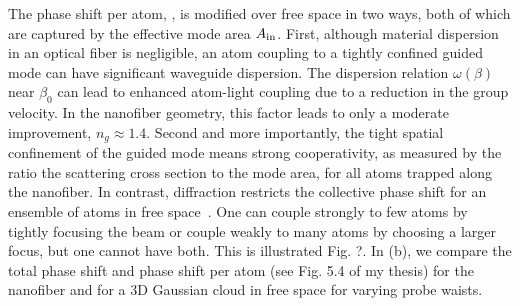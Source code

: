 \documentclass[preprint,aps,pra,onecolumn]{revtex4-1} %
\newcommand{\vac}{{\rm vac}}
\newcommand{\comment}[1]{{\color{Maroon} #1}}
\begin{document}
The phase shift per atom, , is modified over free space in two ways, both of which are captured by the effective mode area $A_{\rm in}$. First, although material dispersion in an optical fiber is negligible, an atom coupling to a tightly confined guided mode can have significant waveguide dispersion.  The dispersion relation $\omega(\beta)$ near $\beta_0$ can lead to enhanced atom-light coupling due to a reduction in the group velocity. In the nanofiber geometry, this factor leads to only a moderate improvement, \comment{ $n_g \approx 1.4$.} Second and more importantly,  the tight spatial confinement of the guided mode means strong cooperativity, as measured by the ratio the scattering cross section to the mode area, for all atoms trapped along the nanofiber.
In contrast, diffraction restricts the collective phase shift for an ensemble of atoms in free space~\cite{baragiola_three-dimensional_2014}. One can couple strongly to few atoms by tightly focusing the beam or couple weakly to many atoms by choosing a larger focus, but one cannot have both. This is illustrated Fig. ?.  In  (b),  we compare the total phase shift and phase shift per atom (see Fig. 5.4 of my thesis) for the nanofiber and for a 3D Gaussian cloud in free space for varying probe waists. 
\end{document}
